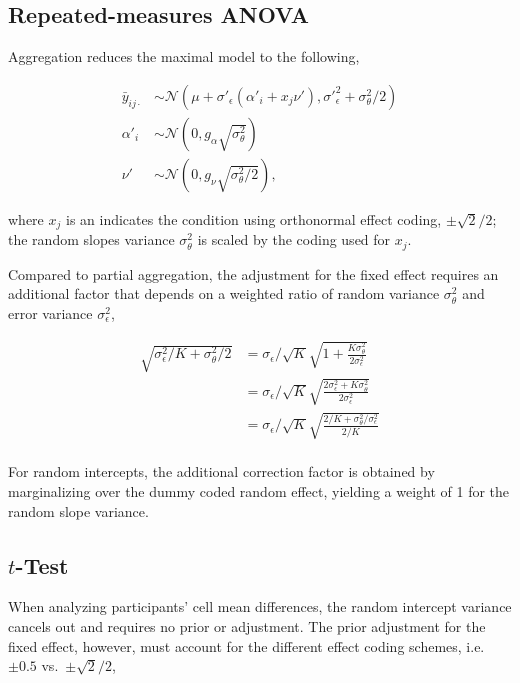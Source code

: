 \documentclass[
  man,floatsintext,draftall]{apa6}
\begin{document}
\hypertarget{repeated-measures-anova}{%
\subsection{Repeated-measures ANOVA}\label{repeated-measures-anova}}

Aggregation reduces the maximal model to the following,

\[
\begin{aligned}
\bar{y}_{ij\cdot} & \sim \mathcal{N}(\mu + \sigma\prime_\epsilon (\alpha\prime_i + x_j \nu\prime), \sigma\prime_\epsilon^2 + \sigma_\theta^2/2) \\
\alpha\prime_i & \sim \mathcal{N}(0, g_\alpha \sqrt{\sigma_\theta^2}) \\
\nu\prime & \sim \mathcal{N}(0, g_{\nu} \sqrt{\sigma_\theta^2/2}), 
\end{aligned}
\]

where \(x_j\) is an indicates the condition using orthonormal effect coding, \(\pm \sqrt{2}/2\); the random slopes variance \(\sigma_\theta^2\) is scaled by the coding used for \(x_j\).

Compared to partial aggregation, the adjustment for the fixed effect requires an additional factor that depends on a weighted ratio of random variance \(\sigma^2_\theta\) and error variance \(\sigma^2_\epsilon\),

\[
\begin{aligned}
\sqrt{\sigma_\epsilon^2/K + \sigma_\theta^2/2} & = \sigma_\epsilon/\sqrt{K} \sqrt{1 + \frac{K\sigma^2_\theta}{2\sigma_\epsilon^2}} \\
  & = \sigma_\epsilon/\sqrt{K} \sqrt{\frac{2\sigma_\epsilon^2 + K\sigma^2_\theta}{2\sigma_\epsilon^2}} \\
  & = \sigma_\epsilon/\sqrt{K} \sqrt{\frac{2/K + \sigma^2_\theta/\sigma_\epsilon^2}{2/K}} \\
\end{aligned}
\]

For random intercepts, the additional correction factor is obtained by marginalizing over the dummy coded random effect, yielding a weight of 1 for the random slope variance.

\hypertarget{t-test}{%
\subsection{\texorpdfstring{\(t\)-Test}{t-Test}}\label{t-test}}

When analyzing participants' cell mean differences, the random intercept variance cancels out and requires no prior or adjustment.
The prior adjustment for the fixed effect, however, must account for the different effect coding schemes, i.e.~\(\pm 0.5\) vs.~\(\pm \sqrt{2}/2\),
\end{document}
